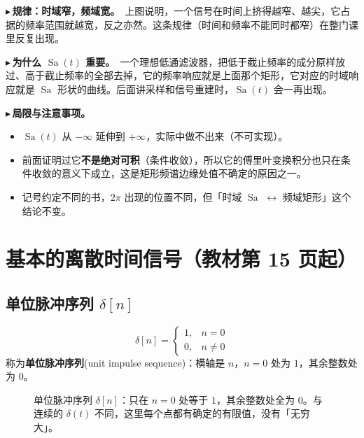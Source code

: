 \documentclass[UTF8,a4paper,11pt]{ctexart}
\newcommand{\Sa}{\operatorname{Sa}}
\newcounter{ex}[section]
\newcommand{\point}[1]{\par\addvspace{1ex}\noindent\textcolor{ptteal}{$\blacktriangleright$\,\textbf{#1}}\ }
\renewcommand{\paragraph}[1]{\point{#1}}
\begin{document}
\paragraph{规律：时域窄，频域宽。}上图说明，一个信号在时间上挤得越窄、越尖，它占据的频率范围就越宽，反之亦然。这条规律（时间和频率不能同时都窄）在整门课里反复出现。

\paragraph{为什么 $\Sa(t)$ 重要。}一个理想低通滤波器，把低于截止频率的成分原样放过、高于截止频率的全部去掉，它的频率响应就是上面那个矩形，它对应的时域响应就是 $\Sa$ 形状的曲线。后面讲采样和信号重建时，$\Sa(t)$ 会一再出现。

\paragraph{局限与注意事项。}
\begin{itemize}[nosep]
\item $\Sa(t)$ 从 $-\infty$ 延伸到 $+\infty$，实际中做不出来（不可实现）。
\item 前面证明过它\textbf{不是绝对可积}（条件收敛），所以它的傅里叶变换积分也只在条件收敛的意义下成立，这是矩形频谱边缘处值不确定的原因之一。
\item 记号约定不同的书，$2\pi$ 出现的位置不同，但「时域 $\Sa$ $\leftrightarrow$ 频域矩形」这个结论不变。
\end{itemize}

\section{基本的离散时间信号（教材第 15 页起）}

\subsection{\texorpdfstring{单位脉冲序列 $\delta[n]$}{单位脉冲序列 δ[n]}}
\[
\delta[n]=\begin{cases}1,&n=0\\0,&n\neq0\end{cases}
\]
称为\textbf{单位脉冲序列}(unit impulse sequence)：横轴是 $n$，$n=0$ 处为 $1$，其余整数处为 $0$。

\begin{figure}[H]
\centering
{}
\caption{单位脉冲序列 $\delta[n]$：只在 $n=0$ 处等于 $1$，其余整数处全为 $0$。与连续的 $\delta(t)$ 不同，这里每个点都有确定的有限值，没有「无穷大」。}
\end{figure}
\end{document}
